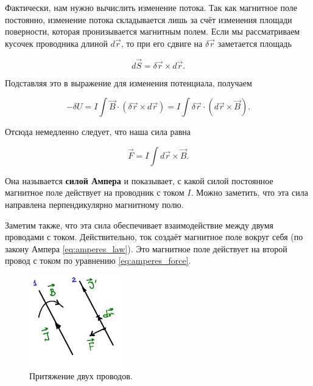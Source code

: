 \documentclass[11pt,a4paper]{article}
\numberwithin{equation}{section}
\begin{document}
Фактически, нам нужно вычислить изменение потока. Так как магнитное
поле постоянно, изменение потока складывается лишь за счёт изменения
площади поверности, которая пронизывается магнитным полем. Если мы
рассматриваем кусочек проводника длиной $d\vec{r}$, то при его сдвиге
на $\delta \vec{r}$ заметается площадь 

\begin{equation}
  \label{eq:der_amperes_force_2}
  d\vec{S} = \delta \vec{r} \times d \vec{r}.
\end{equation}

Подставляя это в выражение для изменения потенциала, получаем

\begin{equation}
  \label{eq:der_amperes_force_3}
  -\delta U = I \int \vec{B} \cdot \left( \delta  \vec{r}
    \times d \vec{r}\right) = I \int \delta \vec{r} \cdot (d\vec{r} \times \vec{B}).
\end{equation}

Отсюда немедленно следует, что наша сила равна 

\begin{equation}
  \label{eq:amperes_force}
  \vec{F} = I  \int d\vec{r} \times \vec{B}.
\end{equation}

Она называется \textbf{силой Ампера} и показывает, с какой силой
постоянное магнитное поле действует на проводник с током $I$. Можно
заметить, что эта сила направлена перпендикулярно магнитному полю.

Заметим также, что эта сила обеспечивает взаимодействие между двумя
проводами с током. Действительно, ток создаёт магнитное поле вокруг
себя (по закону Ампера \eqref{eq:amperes_law}). Это магнитное поле
действует на второй провод с током по уравнению
\eqref{eq:amperes_force}. 

\begin{figure}
  \vspace{-1cm}
  \begin{center}
  \includegraphics[width=4cm]{2wires.pdf}  
  \end{center}
  \vspace{-1cm}
  \caption{Притяжение двух проводов.}
  \label{fig:2wires}
\end{figure}
\end{document}
